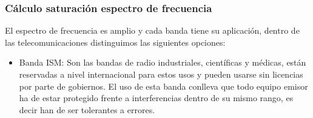 \documentclass[a4paper ,12pt, onecolumn]{article}
\begin{document}
        \subsubsection{Cálculo saturación espectro de frecuencia}
            El espectro de frecuencia es amplio y cada banda tiene su aplicación, dentro de las telecomunicaciones
            distinguimos las siguientes opciones:
            \begin{itemize}
                \item Banda ISM: Son las bandas de radio industriales, científicas y médicas, están reservadas a 
                nivel internacional para estos usos y pueden usarse sin licencias por parte de gobiernos. El uso de esta
                banda conlleva que todo equipo emisor ha de estar protegido frente a interferencias dentro de su mismo 
                rango, es decir han de ser tolerantes a errores.
    

\end{itemize}
\end{document}
